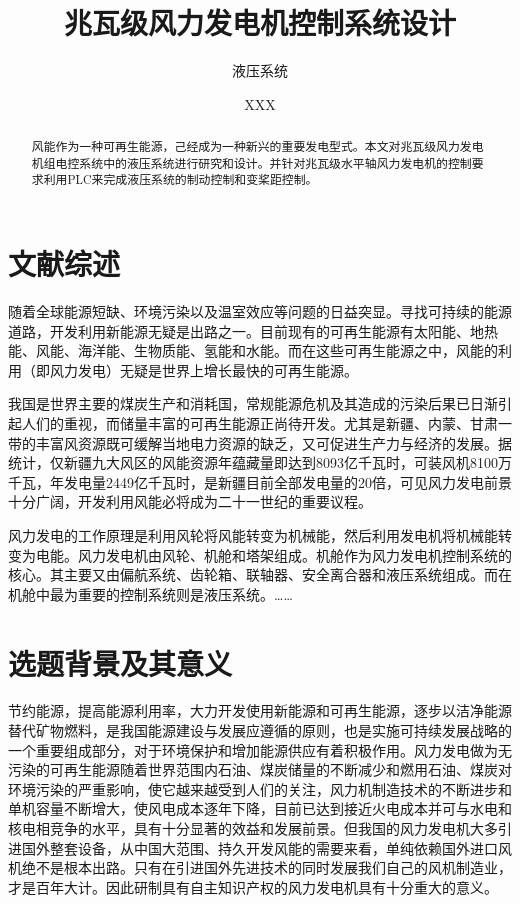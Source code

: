 \documentclass{sdjuproposal}
\title{兆瓦级风力发电机控制系统设计}
\subtitle{液压系统}            %
\author{XXX}
\begin{document}
\makecover

\maketitle
\begin{abstract}
风能作为一种可再生能源，己经成为一种新兴的重要发电型式。本文对兆瓦级风力发电机组电控系统中的液压系统进行研究和设计。并针对兆瓦级水平轴风力发电机的控制要求利用PLC来完成液压系统的制动控制和变桨距控制。
\end{abstract}

\section{文献综述}

随着全球能源短缺、环境污染以及温室效应等\cite{belyaev2005}问题的日益突显。寻找可持续的能源道路，开发利用新能源无疑是出路之一。目前现有的可再生能源有太阳能、地热能、风能、海洋能、生物质能、氢能和水能\cite{wang2006}。而在这些可再生能源之中，风能的利用（即风力发电）无疑是世界上增长最快的可再生能源\cite{long2003}。

我国是世界主要的煤炭生产和消耗国，常规能源危机及其造成的污染后果已日渐引起人们的重视，而储量丰富的可再生能源正尚待开发。尤其是新疆、内蒙、甘肃一带的丰富风资源既可缓解当地电力资源的缺乏，又可促进生产力与经济的发展。据统计，仅新疆九大风区的风能资源年蕴藏量即达到8093亿千瓦时，可装风机8100万千瓦，年发电量2449亿千瓦时，是新疆目前全部发电量的20倍，可见风力发电前景十分广阔，开发利用风能必将成为二十一世纪的重要议程\cite{li2005,gong2005}。

风力发电的工作原理是利用风轮将风能转变为机械能，然后利用发电机将机械能转变为电能\cite{sun1997}。风力发电机由风轮、机舱和塔架组成\cite{wu2006}。机舱作为风力发电机控制系统的核心。其主要又由偏航系统、齿轮箱、联轴器、安全离合器和液压系统组成。而在机舱中最为重要的控制系统则是液压系统\cite{liu2004,yang2006}。……

\section{选题背景及其意义}

节约能源，提高能源利用率，大力开发使用新能源和可再生能源，逐步以洁净能源替代矿物燃料，是我国能源建设与发展应遵循的原则，也是实施可持续发展战略的一个重要组成部分，对于环境保护和增加能源供应有着积极作用。风力发电做为无污染的可再生能源随着世界范围内石油、煤炭储量的不断减少和燃用石油、煤炭对环境污染的严重影响，使它越来越受到人们的关注，风力机制造技术的不断进步和单机容量不断增大，使风电成本逐年下降，目前已达到接近火电成本并可与水电和核电相竞争的水平，具有十分显著的效益和发展前景。但我国的风力发电机大多引进国外整套设备，从中国大范围、持久开发风能的需要来看，单纯依赖国外进口风机绝不是根本出路。只有在引进国外先进技术的同时发展我们自己的风机制造业，才是百年大计。因此研制具有自主知识产权的风力发电机具有十分重大的意义。
\end{document}
